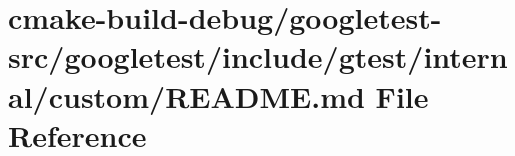 \hypertarget{cmake-build-debug_2googletest-src_2googletest_2include_2gtest_2internal_2custom_2README_8md}{}\section{cmake-\/build-\/debug/googletest-\/src/googletest/include/gtest/internal/custom/\+R\+E\+A\+D\+ME.md File Reference}
\label{cmake-build-debug_2googletest-src_2googletest_2include_2gtest_2internal_2custom_2README_8md}
